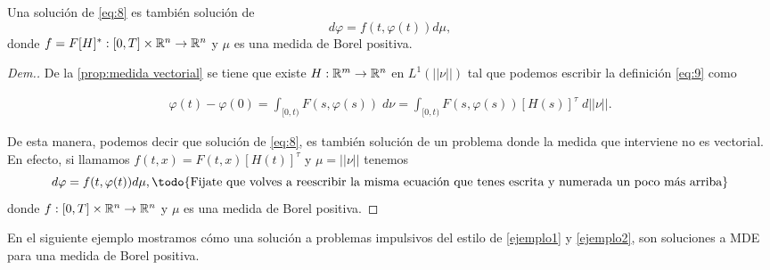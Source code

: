 \begin{thm}\label{thm:m_equivalente} \normalmarginpar{}
Una solución de \eqref{eq:8} es también solución de    
\begin{equation}\label{eq:10}
	d\varphi=f(t,\varphi(t))d\mu,
\end{equation} 
donde $f=F[H]^*:[0,T]\times\mathbb{R}^n\to \mathbb{R}^n$ \reversemarginpar {} y  $\mu$ es una medida de Borel positiva. 
\end{thm}
\begin{proof}[Dem.]
    De la  \eqref{prop:medida vectorial} \normalmarginpar{} se tiene que existe $H:\mathbb{R}^m\to\mathbb{R}^n$ en  $L^1(||\nu||)$ tal que  podemos escribir la definición \eqref{eq:9} como 

    
    \begin{equation*}
        \begin{split}
           \varphi(t)-\varphi(0)=\int_{[0,t)}F(s,\varphi(s))\; d\nu=\int_{[0,t)}F(s,\varphi(s))[H(s)]^\tau\; d||\nu||.
        \end{split}
    \end{equation*}



De esta manera, podemos decir que   solución de \eqref{eq:8}, es también solución de un problema donde la medida que interviene no es vectorial. En efecto, si llamamos $f(t,x)=F(t,x)[H(t)]^\tau$ y $\mu=||\nu||$ tenemos 
\begin{equation*}
	d\varphi=f(t,\varphi(t))d\mu,\reversemarginpar\text{\todo{Fijate que volves a reescribir la misma ecuación que tenes escrita y numerada un poco más arriba}}
\end{equation*} 
donde $f:[0,T]\times\mathbb{R}^n\to \mathbb{R}^n$ y  $\mu$ es una medida de Borel positiva.
\end{proof}

En el siguiente ejemplo mostramos cómo una solución a problemas impulsivos del estilo de \ref{ejemplo1} y \ref{ejemplo2}, son soluciones a MDE para una medida de Borel positiva.



